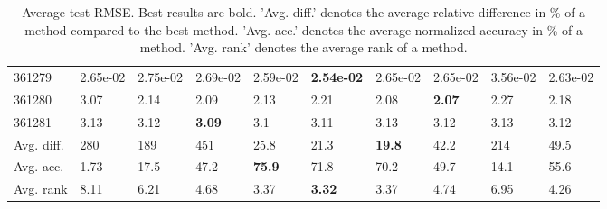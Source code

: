 \begin{table}[ht!]
\begin{tabular}{llllllllll}
  361279 & 2.65e-02 & 2.75e-02 & 2.69e-02 & 2.59e-02 & \textbf{2.54e-02} & 2.65e-02 & 2.65e-02 & 3.56e-02 & 2.63e-02 \\ 
  361280 & 3.07 & 2.14 & 2.09 & 2.13 & 2.21 & 2.08 & \textbf{2.07} & 2.27 & 2.18 \\ 
  361281 & 3.13 & 3.12 & \textbf{3.09} & 3.1 & 3.11 & 3.13 & 3.12 & 3.13 & 3.12 \\ 
   \hline
Avg. diff. & 280 & 189 & 451 & 25.8 & 21.3 & \textbf{19.8} & 42.2 & 214 & 49.5 \\ 
  Avg. acc. & 1.73 & 17.5 & 47.2 & \textbf{75.9} & 71.8 & 70.2 & 49.7 & 14.1 & 55.6 \\ 
  Avg. rank & 8.11 & 6.21 & 4.68 & 3.37 & \textbf{3.32} & 3.37 & 4.74 & 6.95 & 4.26 \\ 
   \hline
\hline
\end{tabular}
\endgroup
\caption{Average test RMSE. 
                  Best results are bold. 
                  'Avg. diff.' denotes the average relative difference in \% of a method compared to the best method.
                  'Avg. acc.' denotes the average normalized accuracy in \% of a method.
                  'Avg. rank' denotes the average rank of a method.} 
\label{TABLES/table_results_RMSE_umap}
\end{table}
